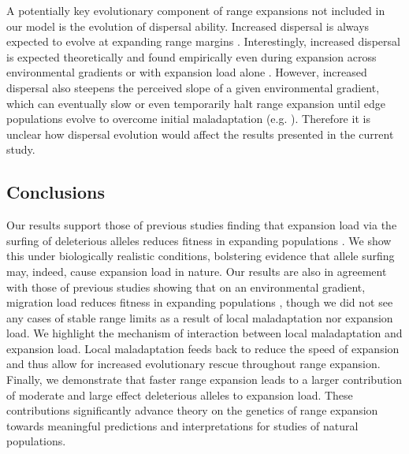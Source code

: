 A potentially key evolutionary component of range expansions not included in our model is the evolution of dispersal ability. Increased dispersal is always expected to evolve at expanding range margins \citep{Hargreaves:2014}. Interestingly, increased dispersal is expected theoretically and found empirically even during expansion across environmental gradients or with expansion load alone \citep{Henry:2015b}. However, increased dispersal also steepens the perceived slope of a given environmental gradient, which can eventually slow or even temporarily halt range expansion until edge populations evolve to overcome initial maladaptation (e.g. \citealt{Phillips:2012}). Therefore it is unclear how dispersal evolution would affect the results presented in the current study.


\subsection*{Conclusions}

Our results support those of previous studies finding that expansion load via the surfing of deleterious alleles reduces fitness in expanding populations \citep{Peischl:2013, Peischl:2015, Peischl:2015b}. We show this under biologically realistic conditions, bolstering evidence that allele surfing may, indeed, cause expansion load in nature. Our results are also in agreement with those of previous studies showing that on an environmental gradient, migration load reduces fitness in expanding populations \citep{Kirkpatrick:1997, Bridle:2010, Polechova:2015}, though we did not see any cases of stable range limits as a result of local maladaptation nor expansion load. We highlight the mechanism of interaction between local maladaptation and expansion load. Local maladaptation feeds back to reduce the speed of expansion and thus allow for increased evolutionary rescue throughout range expansion. Finally, we demonstrate that faster range expansion leads to a larger contribution of moderate and large effect deleterious alleles to expansion load. These contributions significantly advance theory on the genetics of range expansion towards meaningful predictions and interpretations for studies of natural populations.




